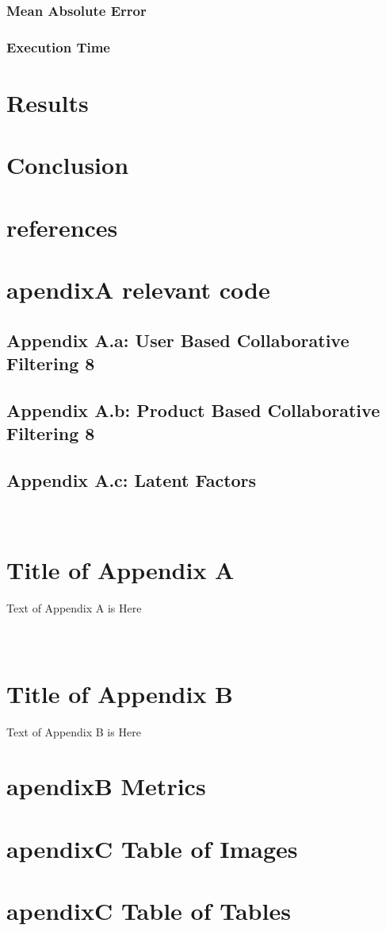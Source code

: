 \documentclass{article}
\begin{document}
\subsubsection{Mean Absolute Error}
\subsubsection{Execution Time}
\cite{ApacheSpark:1}
\cite{RecommenderSystems:2}
\cite{MovieLens:3}

\section{Results}
\section{Conclusion}
\section{references}


\section{apendixA relevant code}
\subsection{Appendix A.a: User Based Collaborative Filtering	8}
\subsection{Appendix A.b: Product Based Collaborative Filtering	8}
\subsection{Appendix A.c: Latent Factors}
\appendix
\section{\\Title of Appendix A}

Text of Appendix A is Here

\section{\\Title of Appendix B}

Text of Appendix B is Here

\section{apendixB Metrics}
\section{apendixC Table of Images}
\section{apendixC Table of Tables}
\newpage


\end{document}
